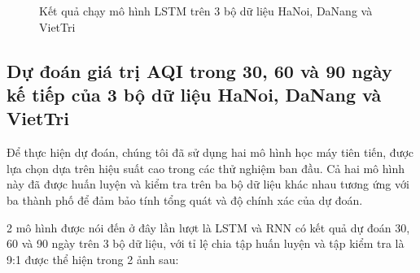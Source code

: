 \documentclass[conference]{IEEEtran}
\begin{document}
\begin{figure}[h]
    \centering
    \caption{Kết quả chạy mô hình LSTM trên 3 bộ dữ liệu HaNoi, DaNang và VietTri}
\end{figure}

\subsection{Dự đoán giá trị AQI trong 30, 60 và 90 ngày kế tiếp của 3 bộ dữ liệu HaNoi, DaNang và VietTri}
Để thực hiện dự đoán, chúng tôi đã sử dụng hai mô hình học máy tiên tiến, được lựa chọn dựa trên hiệu suất cao trong các thử nghiệm ban đầu. Cả hai mô hình này đã được huấn luyện và kiểm tra trên ba bộ dữ liệu khác nhau tương ứng với ba thành phố để đảm bảo tính tổng quát và độ chính xác của dự đoán.

2 mô  hình được nói đến ở đây lần lượt là LSTM và RNN có kết quả dự đoán 30, 60 và 90 ngày trên 3 bộ dữ liệu, với tỉ lệ chia tập huấn luyện và tập kiểm tra là 9:1 được thể hiện trong 2 ảnh sau:
\end{document}
